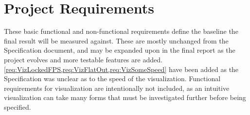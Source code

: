 
\chapter{Project Requirements}
\label{sec:Requirements}
These basic functional and non-functional requirements define the baseline the final result will be measured against.
These are mostly unchanged from the Specification document, and may be expanded upon in the final report as the project evolves and more testable features are added.
\cref{req:VizLockedFPS,req:VizFlatOut,req:VizSomeSpeed} have been added as the Specification was unclear as to the speed of the visualization.
Functional requirements for visualization are intentionally not included, as an intuitive visualization can take many forms that must be investigated further before being specified.

\newcommand{\must}[0]{\textbf{must}}
\newcommand{\should}[0]{\textbf{should}}

